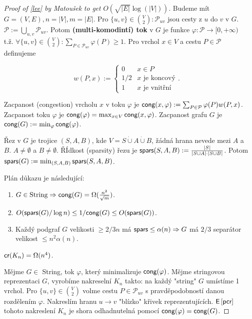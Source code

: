 \begin{proof}[Proof of \ref{lee} by Matoušek to get $O(\sqrt{|E|} \log(|V|))$]
	 Budeme mít $G = (V,E), n = |V|, m = |E|$. Pro $\{u,v\} \in \binom{V}{2}: \mathcal{P}_{uv}$ jsou cesty z $u$ do $v$ v $G$. $\mathcal{P} := \bigcup_{u,v} \mathcal{P}_{uv}$. Potom \textbf{(multi-komodintí) tok} v $G$ je funkce $\varphi : \mathcal{P} \to [0, +\infty)$ t.ž. $\forall \{u,v\} \in \binom{V}{2} : \sum_{P \in \mathcal{P}_{uv}} \varphi(P) \geq 1$. Pro vrchol $x \in V$ a cestu $P \in \mathcal{P}$ definujeme
	 
	 $$
	 w(P,x) := \left\{
	 \begin{array}{ll}
	 	0 & x \in P \\
	 	1/2 & x \text{ je koncový} \\
	 	1 & x \text{ je vnitřní}
	 \end{array}
	 \right..
	 $$
	 
	 Zacpanost (congestion) vrcholu $x$ v toku $\varphi$ je $\textsf{cong}(x,\varphi) := \sum_{P \in \mathcal{P}} \varphi(P) w(P,x)$. Zacpanost toku $\varphi$ je $\textsf{cong}(\varphi) = \max_{x \in V} \textsf{cong}(x, \varphi)$. Zacpanost grafu $G$ je $\textsf{cong}(G) := \min_{\varphi} \textsf{cong}(\varphi)$.
	 
	 Řez v $G$ je trojice $(S,A,B)$, kde $V = S \dot{\cup} A \dot{\cup} B$, žádná hrana nevede mezi $A$ a $B$. $A \neq \emptyset$ a $B \neq \emptyset$. ŘÍdkost (sparsity) řezu je $\textsf{spars}(S,A,B) := \frac{|S|}{|S \cup A| \cdot |S \cup B|}$. Potom $\textsf{spars}(G) := \min_{(S,A,B)} \textsf{spars}(S,A,B)$.
	 
	 Plán důkazu je následující:
	 
	 \begin{enumerate}
	 	\item $G \in \text{String} \Rightarrow \textsf{cong}(G) = \Omega(\frac{n^2}{\sqrt{m}})$.
	 	\item $O(\textsf{spars}(G) / \log n) \leq 1 / \textsf{cong}(G) \leq O(\textsf{spars} (G))$.
	 	\item Každý podgraf $G$ velikosti $\geq 2/3 n$ má $\textsf{spars} \leq \alpha(n) \Rightarrow G$ má $2/3$ separátor velikost $\leq n^2 \alpha(n).$
	 \end{enumerate}
 
 	\begin{fact}
 		$\textsf{cr}(K_n) = \Omega(n^4)$.
 	\end{fact}
 
 	Mějme $G \in$ String, tok $\varphi$, který minimalizuje $\textsf{cong}(\varphi)$. Mějme stringovou reprezentaci $G$, vyrobíme nakreselní $K_n$ takto: na každý "string" $G$ umístíme 1 vrchol. Pro $\{u,v\} \in \binom{V}{2}$ volme cestu $P \in \mathcal{P}_{uv}$ s pravděpodobností danou rozdělením $\varphi$. Nakreslím hranu $u \to v$ "blízko" křivek reprezentujících. $\operatorname{\textsf{E}\,} [\textsf{pcr}]$ tohoto nakreslení $K_n$ je shora odhadnutelná pomocí $\textsf{cong}(\varphi) = \textsf{cong} (G)$.
 	
\end{proof}